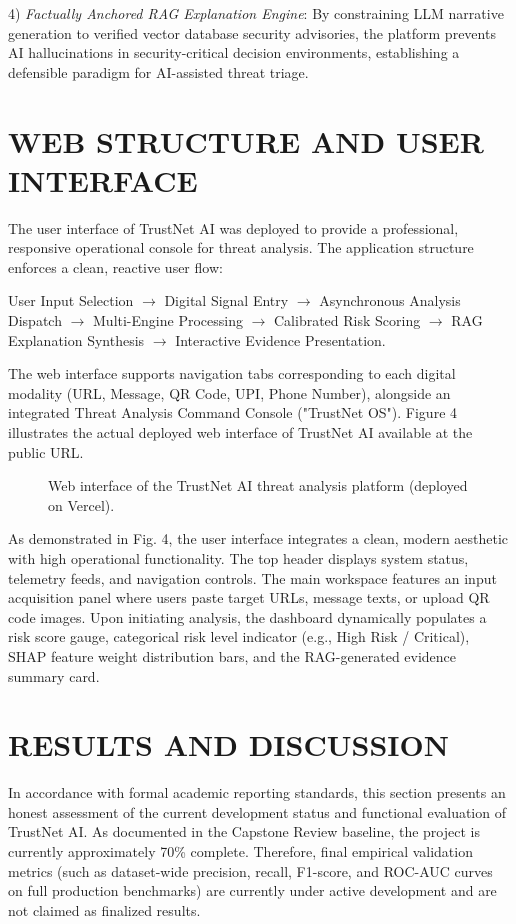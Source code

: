 \documentclass[conference,a4paper]{IEEEtran}
\begin{document}
4) \textit{Factually Anchored RAG Explanation Engine}: By constraining LLM narrative generation to verified vector database security advisories, the platform prevents AI hallucinations in security-critical decision environments, establishing a defensible paradigm for AI-assisted threat triage.

\section{WEB STRUCTURE AND USER INTERFACE}
The user interface of TrustNet AI was deployed to provide a professional, responsive operational console for threat analysis. The application structure enforces a clean, reactive user flow:

User Input Selection $\rightarrow$ Digital Signal Entry $\rightarrow$ Asynchronous Analysis Dispatch $\rightarrow$ Multi-Engine Processing $\rightarrow$ Calibrated Risk Scoring $\rightarrow$ RAG Explanation Synthesis $\rightarrow$ Interactive Evidence Presentation.

The web interface supports navigation tabs corresponding to each digital modality (URL, Message, QR Code, UPI, Phone Number), alongside an integrated Threat Analysis Command Console ("TrustNet OS"). Figure 4 illustrates the actual deployed web interface of TrustNet AI available at the public URL.

\begin{figure}[h]
\centering
\fbox{\rule{0pt}{1.5in} \rule{0.9\linewidth}{0pt}}
\caption{Web interface of the TrustNet AI threat analysis platform (deployed on Vercel).}
\end{figure}

As demonstrated in Fig. 4, the user interface integrates a clean, modern aesthetic with high operational functionality. The top header displays system status, telemetry feeds, and navigation controls. The main workspace features an input acquisition panel where users paste target URLs, message texts, or upload QR code images. Upon initiating analysis, the dashboard dynamically populates a risk score gauge, categorical risk level indicator (e.g., High Risk / Critical), SHAP feature weight distribution bars, and the RAG-generated evidence summary card.

\section{RESULTS AND DISCUSSION}
In accordance with formal academic reporting standards, this section presents an honest assessment of the current development status and functional evaluation of TrustNet AI. As documented in the Capstone Review baseline, the project is currently approximately 70\% complete. Therefore, final empirical validation metrics (such as dataset-wide precision, recall, F1-score, and ROC-AUC curves on full production benchmarks) are currently under active development and are not claimed as finalized results.
\end{document}
